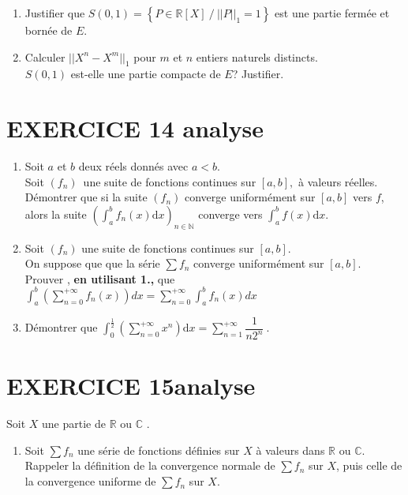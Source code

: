 \documentclass[10pt,oneside]{article}
\begin{document}
\begin{flushleft}
\begin{enumerate}
\begin{enumerate}
\item
  Justifier que $S(0,1)=\left\lbrace  P\in\mathbb{R}[X]\:/\: ||P||_{1}=1\right\rbrace $ est une partie fermée et bornée de $E$.
  \item
  Calculer $||X^n-X^m||_{1}$ pour $m$ et $n$ entiers naturels distincts.\\
  $S(0,1)$ est-elle une partie compacte de $E$? Justifier.
    \end{enumerate}
  \end{enumerate}

\section*{EXERCICE 14 \:analyse }

\begin{enumerate}
\item
Soit $a$ et $b$ deux réels donnés avec $a<b$.\\
  Soit $\left( f_{n}\right) $\ une suite de fonctions continues sur $[a,b],$ \`{a} valeurs r\'{e}elles. \\
Démontrer que si la suite $\left( f_{n}\right)$ converge uniform\'{e}ment sur $\left[ a,b\right] $ vers $f$, alors la suite $\left( \displaystyle\int_{a}^{b}f_{n}\left( x\right)\text{d}x\right)_{n\in \mathbb{N}}$ converge vers $\displaystyle\int_{a}^{b}f\left(x\right) \text{d}x$.

\item 
Soit $(f_n)$ une suite de fonctions continues sur $\left[ a,b\right] $.\\
On suppose que que la série $\displaystyle\sum f_n$ converge uniformément sur $\left[ a,b\right] $.\\
Prouver , \textbf{en utilisant 1.,} que $\displaystyle\int_{a}^{b}\left( \sum_{n=0}^{+\infty}f_n(x)\right) dx=\displaystyle\sum _{n=0}^{+\infty} \int_{a}^{b}f_n(x)dx$
\item
D\'{e}montrer que
$\displaystyle\int_{0}^{\frac{1}{2}}\left( \displaystyle\sum_{n=0}^{+\infty}x^{n}\right) \text{d}x=\displaystyle\sum\limits_{n=1}^{+\infty }\dfrac{1}{n2^{n}}~.$

\end{enumerate}

\section*{EXERCICE 15\:analyse }

Soit $X$ une partie de $\mathbb{R} $ ou $\mathbb{C} $ .
\begin{enumerate}
\item
Soit $\displaystyle\sum f_n$ une série de fonctions définies sur $X$ à valeurs dans $\mathbb{R}$ ou $\mathbb{C}$.\\
Rappeler la définition de la convergence normale de $\displaystyle\sum f_n$ sur $X$, puis celle  de la convergence uniforme de $\displaystyle\sum f_n$ sur $X$.


\end{enumerate}
\end{flushleft}
\end{document}
